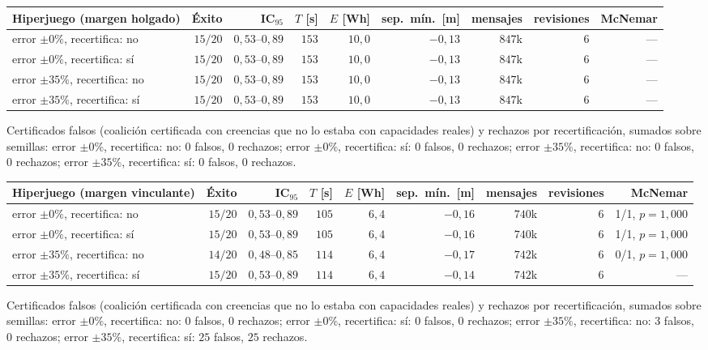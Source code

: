 \begin{center}\small
\begin{tabular}{@{}lrrrrrrrr@{}}
\toprule
Hiperjuego (margen holgado) & Éxito & IC$_{95}$ & $T$ [s] & $E$ [Wh] & sep.\ mín.\ [m] & mensajes & revisiones & McNemar \\
\midrule
error $\pm0\%$, recertifica: no & $15/20$ & $0{,}53$--$0{,}89$ & $153$ & $10{,}0$ & $-0{,}13$ & $847$k & $6$ & — \\
error $\pm0\%$, recertifica: sí & $15/20$ & $0{,}53$--$0{,}89$ & $153$ & $10{,}0$ & $-0{,}13$ & $847$k & $6$ & — \\
error $\pm35\%$, recertifica: no & $15/20$ & $0{,}53$--$0{,}89$ & $153$ & $10{,}0$ & $-0{,}13$ & $847$k & $6$ & — \\
error $\pm35\%$, recertifica: sí & $15/20$ & $0{,}53$--$0{,}89$ & $153$ & $10{,}0$ & $-0{,}13$ & $847$k & $6$ & — \\
\bottomrule
\end{tabular}
\end{center}

Certificados falsos (coalición certificada con creencias que no lo estaba con capacidades reales) y rechazos por recertificación, sumados sobre semillas: error $\pm0\%$, recertifica: no: $0$ falsos, $0$ rechazos; error $\pm0\%$, recertifica: sí: $0$ falsos, $0$ rechazos; error $\pm35\%$, recertifica: no: $0$ falsos, $0$ rechazos; error $\pm35\%$, recertifica: sí: $0$ falsos, $0$ rechazos.

\begin{center}\small
\begin{tabular}{@{}lrrrrrrrr@{}}
\toprule
Hiperjuego (margen vinculante) & Éxito & IC$_{95}$ & $T$ [s] & $E$ [Wh] & sep.\ mín.\ [m] & mensajes & revisiones & McNemar \\
\midrule
error $\pm0\%$, recertifica: no & $15/20$ & $0{,}53$--$0{,}89$ & $105$ & $6{,}4$ & $-0{,}16$ & $740$k & $6$ & 1/1, $p=1{,}000$ \\
error $\pm0\%$, recertifica: sí & $15/20$ & $0{,}53$--$0{,}89$ & $105$ & $6{,}4$ & $-0{,}16$ & $740$k & $6$ & 1/1, $p=1{,}000$ \\
error $\pm35\%$, recertifica: no & $14/20$ & $0{,}48$--$0{,}85$ & $114$ & $6{,}4$ & $-0{,}17$ & $742$k & $6$ & 0/1, $p=1{,}000$ \\
error $\pm35\%$, recertifica: sí & $15/20$ & $0{,}53$--$0{,}89$ & $114$ & $6{,}4$ & $-0{,}14$ & $742$k & $6$ & — \\
\bottomrule
\end{tabular}
\end{center}

Certificados falsos (coalición certificada con creencias que no lo estaba con capacidades reales) y rechazos por recertificación, sumados sobre semillas: error $\pm0\%$, recertifica: no: $0$ falsos, $0$ rechazos; error $\pm0\%$, recertifica: sí: $0$ falsos, $0$ rechazos; error $\pm35\%$, recertifica: no: $3$ falsos, $0$ rechazos; error $\pm35\%$, recertifica: sí: $25$ falsos, $25$ rechazos.
